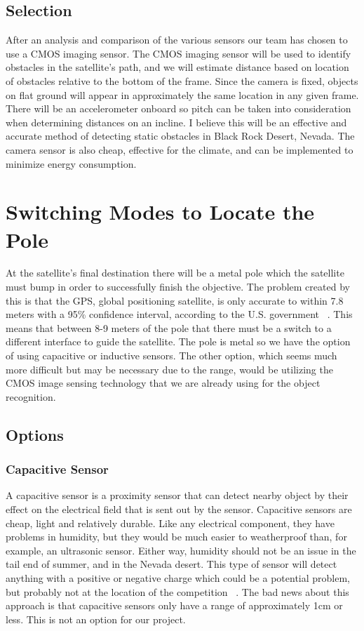 \documentclass[10pt,letterpaper,onecolumn,journal]{IEEEtran}
\begin{document}
\subsection{Selection}
After an analysis and comparison of the various sensors our team has chosen to use a CMOS imaging sensor. The CMOS imaging sensor will be used to identify obstacles in the satellite’s path, and we will estimate distance based on location of obstacles relative to the bottom of the frame. Since the camera is fixed, objects on flat ground will appear in approximately the same location in any given frame. There will be an accelerometer onboard so pitch can be taken into consideration when determining distances on an incline. I believe this will be an effective and accurate method of detecting static obstacles in Black Rock Desert, Nevada. The camera sensor is also cheap, effective for the climate, and can be implemented to minimize energy consumption.

\section{Switching Modes to Locate the Pole}
At the satellite’s final destination there will be a metal pole which the satellite must bump in order to successfully finish the objective. The problem created by this is that the GPS, global positioning satellite, is only accurate to within 7.8 meters with a 95\% confidence interval, according to the U.S. government ~\cite{gps.gov2016}. This means that between 8-9 meters of the pole that there must be a switch to a different interface to guide the satellite. The pole is metal so we have the option of using capacitive or inductive sensors. The other option, which seems much more difficult but may be necessary due to the range, would be utilizing the CMOS image sensing technology that we are already using for the object recognition.

\subsection{Options}
\subsubsection{Capacitive Sensor}
A capacitive sensor is a proximity sensor that can detect nearby object by their effect on the electrical field that is sent out by the sensor. Capacitive sensors are cheap, light and relatively durable. Like any electrical component, they have problems in humidity, but they would be much easier to weatherproof than, for example, an ultrasonic sensor. Either way, humidity should not be an issue in the tail end of summer, and in the Nevada desert. This type of sensor will detect anything with a positive or negative charge which could be a potential problem, but probably not at the location of the competition ~\cite{capacitive}. The bad news about this approach is that capacitive sensors only have a range of approximately 1cm or less. This is not an option for our project.
\end{document}
